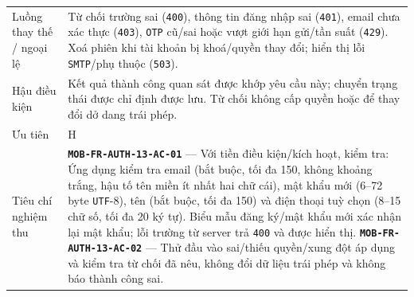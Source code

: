 \begin{longtable}{@{}P{0.23000\SRSWidth}P{0.77000\SRSWidth}@{}}
Luồng thay thế /\allowbreak{} ngoại lệ & Từ chối trường sai (\texttt{400}), thông tin đăng nhập sai (\texttt{401}), email chưa xác thực (\texttt{403}), \texttt{OTP} cũ/\allowbreak{}sai hoặc vượt giới hạn gửi/\allowbreak{}tần suất (\texttt{429}). Xoá phiên khi tài khoản bị khoá/\allowbreak{}quyền thay đổi; hiển thị lỗi \texttt{SMTP}/\allowbreak{}phụ thuộc (\texttt{503}). \\[3pt]
Hậu điều kiện & Kết quả thành công quan sát được khớp yêu cầu này; chuyển trạng thái được chỉ định được lưu. Từ chối không cấp quyền hoặc để thay đổi dở dang trái phép. \\[3pt]
Ưu tiên & H \\[3pt]
Tiêu chí nghiệm thu & \textbf{\texttt{MOB-\allowbreak{}FR-\allowbreak{}AUTH-\allowbreak{}13-\allowbreak{}AC-\allowbreak{}01}} — Với tiền điều kiện/\allowbreak{}kích hoạt, kiểm tra: Ứng dụng kiểm tra email (bắt buộc, tối đa 150, không khoảng trắng, hậu tố tên miền ít nhất hai chữ cái), mật khẩu mới (6–72 byte \texttt{UTF}-8), tên (bắt buộc, tối đa 150) và điện thoại tuỳ chọn (8–15 chữ số, tối đa 20 ký tự). Biểu mẫu đăng ký/\allowbreak{}mật khẩu mới xác nhận lại mật khẩu; lỗi trường từ server trả \texttt{400} và được hiển thị. \textbf{\texttt{MOB-\allowbreak{}FR-\allowbreak{}AUTH-\allowbreak{}13-\allowbreak{}AC-\allowbreak{}02}} — Thử đầu vào sai/\allowbreak{}thiếu quyền/\allowbreak{}xung đột áp dụng và kiểm tra từ chối đã nêu, không đổi dữ liệu trái phép và không báo thành công sai. \\[3pt]

\end{longtable}
